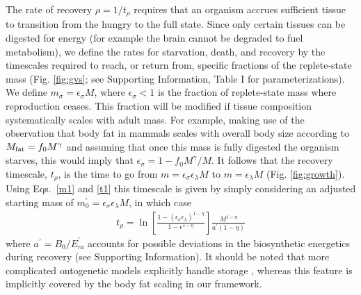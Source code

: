 \documentclass[11pt]{article}
\begin{document}
\begin{multicols}{2}
The rate of recovery $\rho = 1/t_\rho$ requires that an organism accrues
sufficient tissue to transition from the hungry to the full state.  Since
only certain tissues can be digested for energy (for example the brain cannot
be degraded to fuel metabolism), we define the rates for starvation, death,
and recovery by the timescales required to reach, or return from, specific
fractions of the replete-state mass (Fig. \ref{fig:gvs}; see Supporting Information, Table I for parameterizations).  We define
$m_{\sigma}=\epsilon_{\sigma} M$, where $\epsilon_{\sigma}<1$ is the fraction of
replete-state mass where reproduction ceases. This fraction will be modified
if tissue composition systematically scales with adult mass.  For example,
making use of the observation that body fat in mammals scales with overall
body size according to $M_{\rm fat}=f_{0}M^{\gamma}$ and assuming that once
this mass is fully digested the organism starves, this would imply that
$\epsilon_{\sigma}=1-f_{0}M^{\gamma}/M$. It follows that the
recovery timescale, $t_{\rho}$, is the time to go from
$m=\epsilon_{\sigma} \epsilon_{\lambda} M$ to $m=\epsilon_{\lambda}M$ (Fig. \ref{fig:growth}). Using Eqs.~\eqref{m1} and \eqref{t1} this timescale is given by simply considering an adjusted starting mass of $m_{0}^{\prime}=\epsilon_{\sigma}\epsilon_{\lambda}M$, in which case
\begin{eqnarray}
t_{\rho}=\ln\left[\frac{1-\left(\epsilon_{\sigma}\epsilon_{\lambda}\right)^{1-\eta}}{1-\epsilon^{1-\eta}}\right]\frac{M^{1-\eta}}{a^{\prime}\left(1-\eta\right)}
\end{eqnarray}
where $a^{\prime}=B_{0}/E_{m}^{\prime}$ accounts for possible deviations in the biosynthetic energetics during recovery (see Supporting Information). It should be noted that more complicated ontogenetic models explicitly handle
storage \cite{hou}, whereas this feature is implicitly covered by the body
fat scaling in our framework.


\end{multicols}
\end{document}
